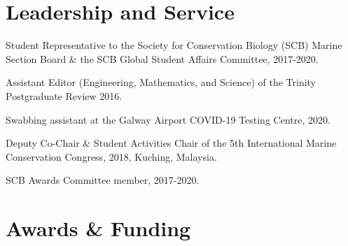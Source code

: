 \documentclass[a4paper]{deedy-resume} %
\begin{document}
\sectionspace


\begin{flushleft}

\sectionspace


\section{Leadership and Service} 


\begin{tightitemize}
\item Student Representative to the Society for Conservation Biology (SCB) Marine Section Board \& the SCB Global Student Affairs Committee, 2017-2020. 
\item Assistant Editor (Engineering, Mathematics, and Science) of the Trinity Postgraduate Review 2016.
\end{tightitemize}

\sectionspace

\begin{tightitemize}
\item Swabbing assistant at the Galway Airport COVID-19 Testing Centre, 2020.
\item Deputy Co-Chair \& Student Activities Chair of the 5th International Marine Conservation Congress, 2018, Kuching, Malaysia.
\item SCB Awards Committee member, 2017-2020.
\end{tightitemize}

\sectionspace


\section{Awards \& Funding}


\end{flushleft}
\end{document}
